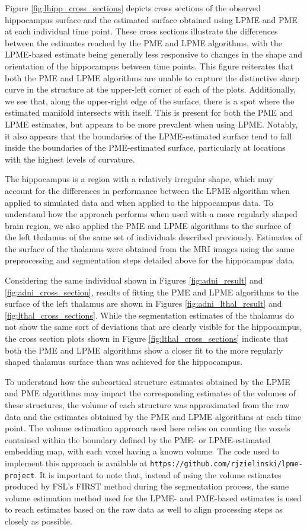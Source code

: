 \documentclass[11pt,reqno]{article}
\theoremstyle{definition}
\begin{document}
Figure \ref{fig:lhipp_cross_sections} depicts cross sections of the observed hippocampus surface and the estimated surface obtained using LPME and PME at each individual time point. These cross sections illustrate the differences between the estimates reached by the PME and LPME algorithms, with the LPME-based estimate being generally less responsive to changes in the shape and orientation of the hippocampus between time points. This figure reiterates that both the PME and LPME algorithms are unable to capture the distinctive sharp curve in the structure at the upper-left corner of each of the plots. Additionally, we see that, along the upper-right edge of the surface, there is a spot where the estimated manifold intersects with itself. This is present for both the PME and LPME estimates, but appears to be more prevalent when using LPME. Notably, it also appears that the boundaries of the LPME-estimated surface tend to fall inside the boundaries of the PME-estimated surface, particularly at locations with the highest levels of curvature.

The hippocampus is a region with a relatively irregular shape, which may account for the differences in performance between the LPME algorithm when applied to simulated data and when applied to the hippocampus data. To understand how the approach performs when used with a more regularly shaped brain region, we also applied the PME and LPME algorithms to the surface of the left thalamus of the same set of individuals described previously. Estimates of the surface of the thalamus were obtained from the MRI images using the same preprocessing and segmentation steps detailed above for the hippocampus data.

Considering the same individual shown in Figures \ref{fig:adni_result} and \ref{fig:adni_cross_section}, results of fitting the PME and LPME algorithms to the surface of the left thalamus are shown in Figures \ref{fig:adni_lthal_result} and \ref{fig:lthal_cross_sections}. While the segmentation estimates of the thalamus do not show the same sort of deviations that are clearly visible for the hippocampus, the cross section plots shown in Figure \ref{fig:lthal_cross_sections} indicate that both the PME and LPME algorithms show a closer fit to the more regularly shaped thalamus surface than was achieved for the hippocampus.

To understand how the subcortical structure estimates obtained by the LPME and PME algorithms may impact the corresponding estimates of the volumes of these structures, the volume of each structure was approximated from the raw data and the estimates obtained by the PME and LPME algorithms at each time point. The volume estimation approach used here relies on counting the voxels contained within the boundary defined by the PME- or LPME-estimated embedding map, with each voxel having a known volume.  The code used to implement this approach is available at \texttt{https://github.com/rjzielinski/lpme-project}. It is important to note that, instead of using the volume estimates produced by FSL's FIRST method during the segmentation process, the same volume estimation method used for the LPME- and PME-based estimates is used to reach estimates based on the raw data as well to align processing steps as closely as possible.
\end{document}
